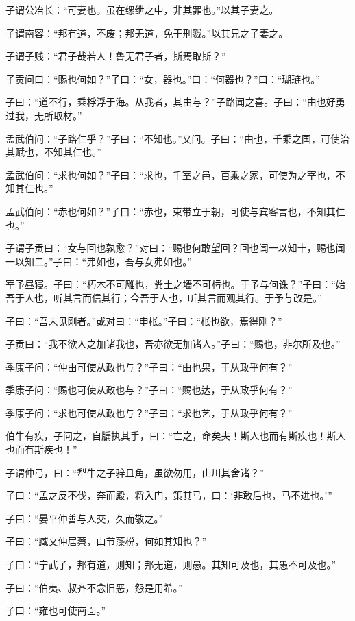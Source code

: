 \documentclass[a5paper]{ctexbook}
\begin{document}
    子谓公冶长：“可妻也。虽在缧绁之中，非其罪也。”以其子妻之。

    子谓南容：“邦有道，不废；邦无道，免于刑戮。”以其兄之子妻之。

    子谓子贱：“君子哉若人！鲁无君子者，斯焉取斯？”

    子贡问曰：“赐也何如？”子曰：“女，器也。”曰：“何器也？”曰：“瑚琏也。”

    子曰：“道不行，乘桴浮于海。从我者，其由与？”子路闻之喜。子曰：“由也好勇过我，无所取材。”

    孟武伯问：“子路仁乎？”子曰：“不知也。”又问。子曰：“由也，千乘之国，可使治其赋也，不知其仁也。”
    
    孟武伯问：“求也何如？”子曰：“求也，千室之邑，百乘之家，可使为之宰也，不知其仁也。”
    
    孟武伯问：“赤也何如？”子曰：“赤也，束带立于朝，可使与宾客言也，不知其仁也。”

    子谓子贡曰：“女与回也孰愈？”对曰：“赐也何敢望回？回也闻一以知十，赐也闻一以知二。”子曰：“弗如也，吾与女弗如也。”

    宰予昼寝。子曰：“朽木不可雕也，粪土之墙不可杇也。于予与何诛？”子曰：“始吾于人也，听其言而信其行；今吾于人也，听其言而观其行。于予与改是。”

    子曰：“吾未见刚者。”或对曰：“申枨。”子曰：“枨也欲，焉得刚？”

    子贡曰：“我不欲人之加诸我也，吾亦欲无加诸人。”子曰：“赐也，非尔所及也。”

    季康子问：“仲由可使从政也与？”子曰：“由也果，于从政乎何有？”
    
    季康子问：“赐也可使从政也与？”子曰：“赐也达，于从政乎何有？”
    
    季康子问：“求也可使从政也与？”子曰：“求也艺，于从政乎何有？”

    伯牛有疾，子问之，自牖执其手，曰：“亡之，命矣夫！斯人也而有斯疾也！斯人也而有斯疾也！”

    子谓仲弓，曰：“犁牛之子骍且角，虽欲勿用，山川其舍诸？”

    子曰：“孟之反不伐，奔而殿，将入门，策其马，曰：‘非敢后也，马不进也。’”

    子曰：“晏平仲善与人交，久而敬之。”

    子曰：“臧文仲居蔡，山节藻棁，何如其知也？”

    子曰：“宁武子，邦有道，则知；邦无道，则愚。其知可及也，其愚不可及也。”

    子曰：“伯夷、叔齐不念旧恶，怨是用希。”

    子曰：“雍也可使南面。”
\end{document}
